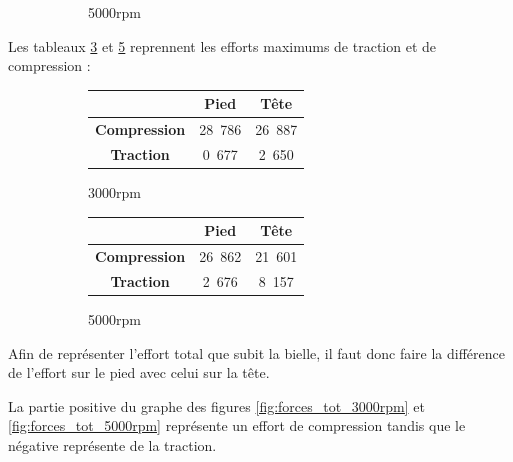 \documentclass{article}
\begin{document}
\begin{figure}[h]
\begin{subfigure}[b]{0.45\textwidth}
                \caption{\unit{5000}{rpm}}
                \label{fig:forces_5000rpm}
    \end{subfigure}
    \caption{}
\end{figure}


Les tableaux \ref{fig:tab_forces_3000rpm} et \ref{fig:tab_forces_5000rpm} reprennent les efforts maximums de traction et de compression :

\begin{figure}[h]
\centering
    \begin{subfigure}[b]{0.45\textwidth}
    		\begin{tabular}{|c|c|c|}
		\hline 
  		& \textbf{Pied} & \textbf{Tête} \\ 
		\hline 
		\textbf{Compression} & \unit{28.786}{ \kilo\newton} & \unit{26.887}{\kilo\newton} \\ 
		\hline 
		\textbf{Traction} & \unit{0.677}{ \kilo\newton} & \unit{2.650}{ \kilo\newton} \\ 
		\hline 
		\end{tabular}
		\caption{\unit{3000}{rpm}}
		\label{fig:tab_forces_3000rpm}
    \end{subfigure}
    \begin{subfigure}[b]{0.45\textwidth}
        	\begin{tabular}{|c|c|c|}
		\hline 
  		& \textbf{Pied} & \textbf{Tête} \\ 
		\hline 
		\textbf{Compression} & \unit{26.862}{ \kilo\newton} & \unit{21.601}{ \kilo\newton}\\ 
		\hline 
		\textbf{Traction} & \unit{2.676}{ \kilo\newton} & \unit{8.157}{\kilo\newton} \\ 
		\hline 
		\end{tabular} 	
		\caption{\unit{5000}{rpm}}
		\label{fig:tab_forces_5000rpm}	
    \end{subfigure}
    \caption{}
\end{figure}

Afin de représenter l'effort total que subit la bielle, il faut donc faire la différence de l'effort sur le pied avec celui sur la tête.

La partie positive du graphe des figures \ref{fig:forces_tot_3000rpm} et \ref{fig:forces_tot_5000rpm} représente un effort de compression tandis que le négative représente de la traction.
\end{document}
